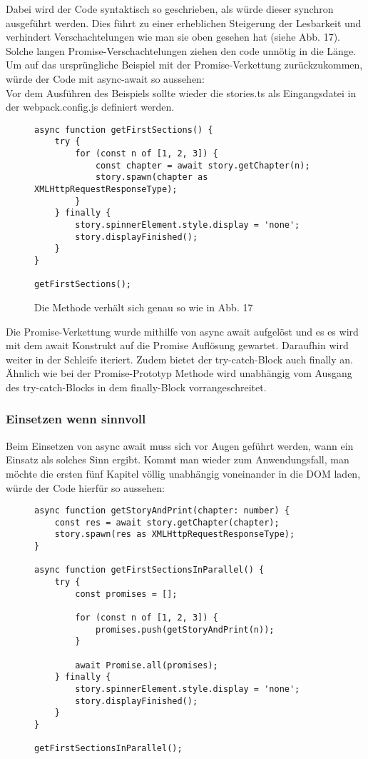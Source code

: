 \noindent
Dabei wird der Code syntaktisch so geschrieben, als würde dieser synchron ausgeführt werden. Dies führt zu einer erheblichen Steigerung der Lesbarkeit und verhindert Verschachtelungen wie man sie oben gesehen hat (siehe Abb. 17). Solche langen Promise-Verschachtelungen ziehen den code unnötig in die Länge. Um auf das ursprüngliche Beispiel mit der Promise-Verkettung zurückzukommen, würde der Code mit async-await so aussehen:\\

\noindent
Vor dem Ausführen des Beispiels sollte wieder die stories.ts als Eingangsdatei in der webpack.config.js definiert werden.

\begin{figure}[H]
\begin{lstlisting}
async function getFirstSections() {
    try {
        for (const n of [1, 2, 3]) {
            const chapter = await story.getChapter(n);
            story.spawn(chapter as XMLHttpRequestResponseType);
        }
    } finally {
        story.spinnerElement.style.display = 'none';
        story.displayFinished();
    }
}

getFirstSections();
\end{lstlisting}
\caption{Die Methode verhält sich genau so wie in Abb. 17}
\end{figure}

\noindent
Die Promise-Verkettung wurde mithilfe von async await aufgelöst und es es wird mit dem await Konstrukt auf die Promise Auflösung gewartet. Daraufhin wird weiter in der Schleife iteriert. Zudem bietet der try-catch-Block auch finally an. Ähnlich wie bei der Promise-Prototyp Methode wird unabhängig vom Ausgang des try-catch-Blocks in dem finally-Block vorrangeschreitet.

\subsubsection{Einsetzen wenn sinnvoll}

Beim Einsetzen von async await muss sich vor Augen geführt werden, wann ein Einsatz als solches Sinn ergibt. Kommt man wieder zum Anwendungsfall, man möchte die ersten fünf Kapitel völlig unabhängig voneinander in die DOM laden, würde der Code hierfür so aussehen:

\begin{figure}[H]
\begin{lstlisting}
async function getStoryAndPrint(chapter: number) {
    const res = await story.getChapter(chapter);
    story.spawn(res as XMLHttpRequestResponseType);
}

async function getFirstSectionsInParallel() {
    try {
        const promises = [];

        for (const n of [1, 2, 3]) {
            promises.push(getStoryAndPrint(n));
        }

        await Promise.all(promises);
    } finally {
        story.spinnerElement.style.display = 'none';
        story.displayFinished();
    }
}

getFirstSectionsInParallel();
\end{lstlisting}
\end{figure}


